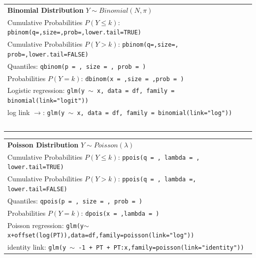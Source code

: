 \documentclass[landscape,a0paper,fontscale=0.285]{baposter} %
\begin{document}
\begin{poster}
{\begin{tabular}{@{}ll@{}}
\textbf{Binomial Distribution} $Y\sim Binomial(N, \pi)$\\
\multicolumn{2}{l}{\cellcolor[HTML]{DDFFFF} Cumulative Probabilities $P(Y \leq k)$: \texttt{pbinom(q=,size=,prob=,lower.tail=TRUE)}} \\
\multicolumn{2}{l}{\cellcolor[HTML]{DDFFFF} Cumulative Probabilities $P(Y > k)$: \texttt{pbinom(q=,size=, prob=,lower.tail=FALSE)}} \\
\multicolumn{2}{l}{\cellcolor[HTML]{FFFFFF} Quantiles: \texttt{qbinom(p = , size = , prob = )}} \\
\multicolumn{2}{l}{\cellcolor[HTML]{DDFFFF} Probabilities $P(Y=k)$: \texttt{dbinom(x = ,size = ,prob = )}} \\
\multicolumn{2}{l}{\cellcolor[HTML]{FFFFFF} Logistic regression: \texttt{glm(y $\sim$ x, data = df, family = binomial(link="logit"))}} \\ 
\multicolumn{2}{l}{\cellcolor[HTML]{FFFFFF} log link $\to$: \texttt{glm(y $\sim$ x, data = df, family = binomial(link="log"))}} \\ \ \\
\end{tabular}


\begin{tabular}{@{}ll@{}}
\textbf{Poisson Distribution} $Y\sim Poisson(\lambda)$\\
\multicolumn{2}{l}{\cellcolor[HTML]{DDFFFF} Cumulative Probabilities $P(Y \leq k)$: \texttt{ppois(q = , lambda = , lower.tail=TRUE)}} \\
\multicolumn{2}{l}{\cellcolor[HTML]{DDFFFF} Cumulative Probabilities $P(Y > k)$: \texttt{ppois(q = , lambda =, lower.tail=FALSE)}} \\
\multicolumn{2}{l}{\cellcolor[HTML]{FFFFFF} Quantiles: \texttt{qpois(p = , size = , prob = )}} \\
\multicolumn{2}{l}{\cellcolor[HTML]{DDFFFF} Probabilities $P(Y=k)$: \texttt{dpois(x = ,lambda = )}} \\
\multicolumn{2}{l}{\cellcolor[HTML]{FFFFFF} Poisson regression: \texttt{glm(y$\sim$x+offset(log(PT)),data=df,family=poisson(link="log"))}}  \\
\multicolumn{2}{l}{\cellcolor[HTML]{FFFFFF} identity link: \texttt{glm(y $\sim$ -1 + PT + PT:x,family=poisson(link="identity"))}}  \\
\end{tabular}


}
\end{poster}
\end{document}
